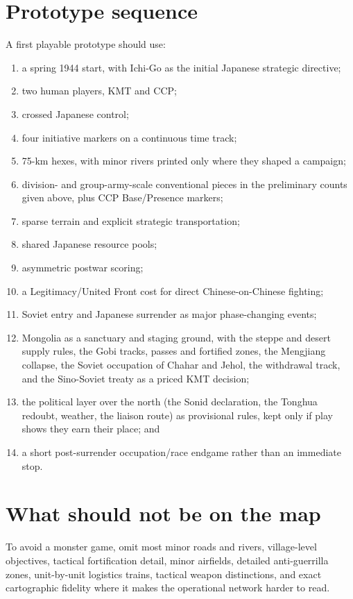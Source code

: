 \documentclass[11pt]{article}
\begin{document}
\section{Prototype sequence}
A first playable prototype should use:
\begin{enumerate}
\item a spring 1944 start, with Ichi-Go as the initial Japanese strategic directive;
\item two human players, KMT and CCP;
\item crossed Japanese control;
\item four initiative markers on a continuous time track;
\item 75-km hexes, with minor rivers printed only where they shaped a campaign;
\item division- and group-army-scale conventional pieces in the preliminary counts given above, plus CCP Base/Presence markers;
\item sparse terrain and explicit strategic transportation;
\item shared Japanese resource pools;
\item asymmetric postwar scoring;
\item a Legitimacy/United Front cost for direct Chinese-on-Chinese fighting;
\item Soviet entry and Japanese surrender as major phase-changing events;
\item Mongolia as a sanctuary and staging ground, with the steppe and desert supply rules, the Gobi tracks, passes and fortified zones, the Mengjiang collapse, the Soviet occupation of Chahar and Jehol, the withdrawal track, and the Sino-Soviet treaty as a priced KMT decision;
\item the political layer over the north (the Sonid declaration, the Tonghua redoubt, weather, the liaison route) as provisional rules, kept only if play shows they earn their place; and
\item a short post-surrender occupation/race endgame rather than an immediate stop.
\end{enumerate}

\section{What should not be on the map}
To avoid a monster game, omit most minor roads and rivers, village-level objectives, tactical fortification detail, minor airfields, detailed anti-guerrilla zones, unit-by-unit logistics trains, tactical weapon distinctions, and exact cartographic fidelity where it makes the operational network harder to read.
\end{document}
